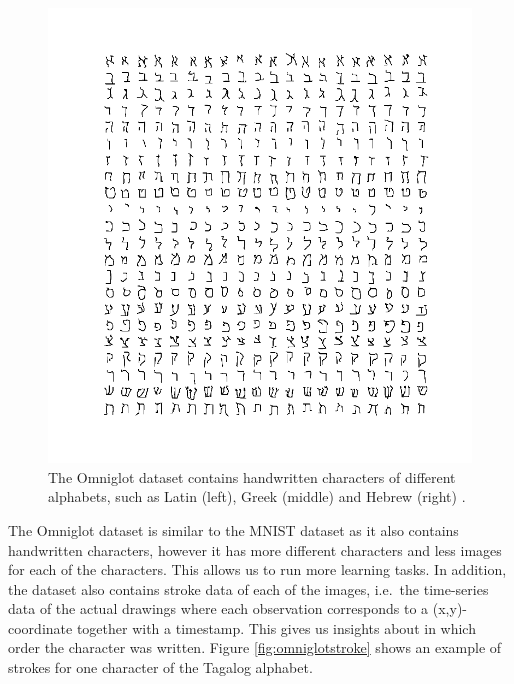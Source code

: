 \begin{figure}[h]
\begin{minipage}{.32\textwidth}
\end{minipage}
\begin{minipage}{.32\textwidth}
  \centering
  \includegraphics[width=\linewidth]{images/hebrew}
\end{minipage}
\caption{The Omniglot dataset contains handwritten characters of different alphabets, such as Latin (left), Greek (middle) and Hebrew (right) \cite{Lake1332}.}
\label{fig:omniglotcharacters}
\end{figure}

The Omniglot dataset is similar to the MNIST dataset as it also contains handwritten characters, however it has more different characters and less images for each of the characters. This allows us to run more learning tasks. In addition, the dataset also contains stroke data of each of the images, i.e.\ the time-series data of the actual drawings where each observation corresponds to a (x,y)-coordinate together with a timestamp. This gives us insights about in which order the character was written. Figure \ref{fig:omniglotstroke} shows an example of strokes for one character of the Tagalog alphabet.

